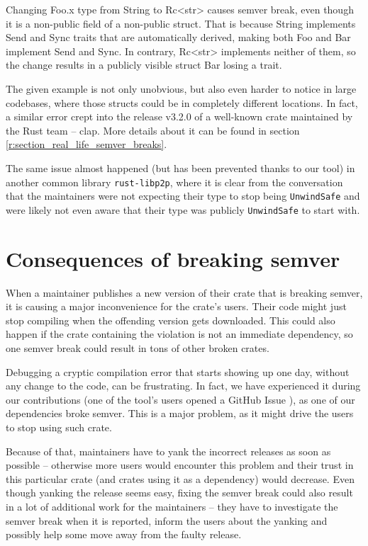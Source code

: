 \documentclass[licencjacka,en]{pracamgr}
\begin{document}
Changing {\ttfamily Foo.x} type from {\ttfamily String} to {\ttfamily Rc<str>}
causes semver break, even though it is a non-public field of a non-public struct.
That is because {\ttfamily String} implements {\ttfamily Send} and {\ttfamily Sync} traits
that are automatically derived, making both {\ttfamily Foo} and {\ttfamily Bar}
implement {\ttfamily Send} and {\ttfamily Sync}.
In contrary, {\ttfamily Rc<str>} implements neither of them,
so the change results in a publicly visible struct {\ttfamily Bar} losing a trait.

The given example is not only unobvious, but also even harder to notice in large codebases, where
those structs could be in completely different locations. In fact, a similar error crept into the
release v3.2.0 of a well-known crate maintained by the Rust team -- {\ttfamily clap}. More details
about it can be found in section \ref{r:section_real_life_semver_breaks}.

The same issue almost happened (but has been prevented thanks to our tool) in another common
library \texttt{rust-libp2p}, where it is clear from the conversation \cite{issue_libp2p} that
the maintainers were not expecting their type to stop being \texttt{UnwindSafe} and were likely
not even aware that their type was publicly \texttt{UnwindSafe} to start with.

\section{Consequences of breaking semver}

When a maintainer publishes a new version of their crate that is breaking semver,
it is causing a major inconvenience for the crate's users.
Their code might just stop compiling when the offending version gets downloaded.
This could also happen if the crate containing the violation is not an immediate dependency,
so one semver break could result in tons of other broken crates.

Debugging a cryptic compilation error that starts showing up one day,
without any change to the code, can be frustrating. In fact, we have experienced it during our
contributions (one of the tool's users opened a GitHub Issue \cite{issue_compiling_fails}), as one
of our dependencies broke semver. This is a major problem, as it might drive the users to stop
using such crate.

Because of that, maintainers have to yank the incorrect releases as soon as possible -- otherwise
more users would encounter this problem and their trust in this particular crate (and crates using
it as a dependency) would decrease. Even though yanking the release seems easy, fixing the semver
break could also result in a lot of additional work for the maintainers -- they have to investigate
the semver break when it is reported, inform the users about the yanking and possibly help some
move away from the faulty release.
\end{document}
